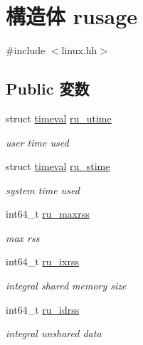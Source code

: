 \hypertarget{structLinux_1_1rusage}{
\section{構造体 rusage}
\label{structLinux_1_1rusage}
}


{\ttfamily \#include $<$linux.hh$>$}\subsection*{Public 変数}
\begin{DoxyCompactItemize}
\item 
struct \hyperlink{structLinux_1_1timeval}{timeval} \hyperlink{structLinux_1_1rusage_a40e27c5d4340b0c6532787d6740b22ab}{ru\_\-utime}
\begin{DoxyCompactList}\small\item\em user time used \item\end{DoxyCompactList}\item 
struct \hyperlink{structLinux_1_1timeval}{timeval} \hyperlink{structLinux_1_1rusage_a15f836efd7b69c0a0eb19f5d9505e3e9}{ru\_\-stime}
\begin{DoxyCompactList}\small\item\em system time used \item\end{DoxyCompactList}\item 
int64\_\-t \hyperlink{structLinux_1_1rusage_a67b085d370d7a42fec998a14f6ea1eab}{ru\_\-maxrss}
\begin{DoxyCompactList}\small\item\em max rss \item\end{DoxyCompactList}\item 
int64\_\-t \hyperlink{structLinux_1_1rusage_a13da5e5855b52e8b43ecd6c6d671708e}{ru\_\-ixrss}
\begin{DoxyCompactList}\small\item\em integral shared memory size \item\end{DoxyCompactList}\item 
int64\_\-t \hyperlink{structLinux_1_1rusage_a957d4290597d297f4fe76a7136182b75}{ru\_\-idrss}
\begin{DoxyCompactList}\small\item\em integral unshared data  \item\end{DoxyCompactList}\item 

\end{DoxyCompactItemize}
